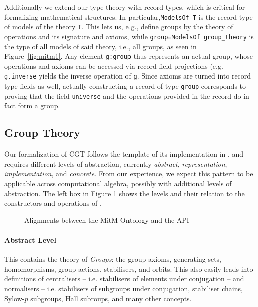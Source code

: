 Additionally we extend our type theory with record types, which is critical for formalizing mathematical structures.
In particular,\lstinline|ModelsOf T| is the record type of models of the theory \lstinline|T|.
This lets us, e.g., define groups by the theory of operations and its signature and axioms, while \lstinline|group=ModelsOf group_theory| is the type of all models of said theory, i.e., all groups, as seen in Figure~\ref{fig:mitm1}.
Any element \lstinline|g:group| thus represents an actual group, whose operations and axioms can be accessed via record field projections (e.g. \lstinline|g.inverse| yields the inverse operation of \lstinline|g|.
Since axioms are turned into record type fields as well, actually constructing a record of type \lstinline|group| corresponds to proving that the field \lstinline|universe| and the operations provided in the record do in fact form a group.

\subsection{Group Theory}

Our formalization of CGT follows the template of its implementation in \GAP, and
requires different levels of abstraction, currently \emph{abstract},
\emph{representation}, \emph{implementation}, and \emph{concrete}. From our
experience, we expect this pattern to be applicable across computational
algebra, possibly with additional levels of abstraction. The left box in Figure
\ref{fig:cgtontology} shows the levels and their relation to the constructors and operations of \GAP.

\begin{figure}[ht]\centering
  \caption{Alignments between the MitM Ontology and the \GAP API}\label{fig:cgtontology}
\end{figure}

\paragraph{Abstract Level} This contains the theory of \emph{Groups}: the group
axioms, generating sets, homomorphisms, group actions, stabilisers, and orbits.
This also easily leads into definitions of centralisers -- i.e. stabilisers of
elements under conjugation -- and normalisers -- i.e. stabilisers of subgroups
under conjugation, stabiliser chains, Sylow-$p$ subgroups, Hall subroups, and
many other concepts.

